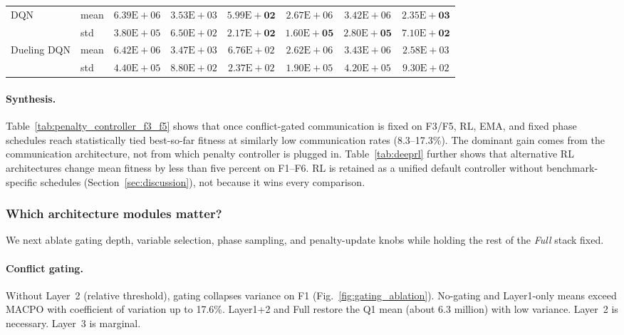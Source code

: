 \documentclass[conference]{IEEEtran}
\begin{document}
\begin{table}[!t]
\begin{tabular}{llcccccc}
DQN & mean & $6.39\mathrm{E}\!+\!06$ & $3.53\mathrm{E}\!+\!03$ & $\mathbf{5.99\mathrm{E}\!+\!02}$ & $2.67\mathrm{E}\!+\!06$ & $3.42\mathrm{E}\!+\!06$ & $\mathbf{2.35\mathrm{E}\!+\!03}$ \\
 & std & $3.80\mathrm{E}\!+\!05$ & $6.50\mathrm{E}\!+\!02$ & $\mathbf{2.17\mathrm{E}\!+\!02}$ & $\mathbf{1.60\mathrm{E}\!+\!05}$ & $\mathbf{2.80\mathrm{E}\!+\!05}$ & $\mathbf{7.10\mathrm{E}\!+\!02}$ \\
Dueling DQN & mean & $6.42\mathrm{E}\!+\!06$ & $3.47\mathrm{E}\!+\!03$ & $6.76\mathrm{E}\!+\!02$ & $2.62\mathrm{E}\!+\!06$ & $3.43\mathrm{E}\!+\!06$ & $2.58\mathrm{E}\!+\!03$ \\
 & std & $4.40\mathrm{E}\!+\!05$ & $8.80\mathrm{E}\!+\!02$ & $2.37\mathrm{E}\!+\!02$ & $1.90\mathrm{E}\!+\!05$ & $4.20\mathrm{E}\!+\!05$ & $9.30\mathrm{E}\!+\!02$ \\
\bottomrule
\end{tabular}
\end{table}

\paragraph{Synthesis.} Table~\ref{tab:penalty_controller_f3_f5} shows that once conflict-gated communication is fixed on F3/F5, RL, EMA, and fixed phase schedules reach statistically tied best-so-far fitness at similarly low communication rates (8.3--17.3\%). The dominant gain comes from the communication architecture, not from which penalty controller is plugged in. Table~\ref{tab:deeprl} further shows that alternative RL architectures change mean fitness by less than five percent on F1--F6. RL is retained as a unified default controller without benchmark-specific schedules (Section~\ref{sec:discussion}), not because it wins every comparison.

\subsubsection{Which architecture modules matter?}\label{sec:q3_modules}
We next ablate gating depth, variable selection, phase sampling, and penalty-update knobs while holding the rest of the \emph{Full} stack fixed.

\paragraph{Conflict gating.} Without Layer~2 (relative threshold), gating collapses variance on F1 (Fig.~\ref{fig:gating_ablation}). No-gating and Layer1-only means exceed MACPO with coefficient of variation up to 17.6\%. Layer1+2 and Full restore the Q1 mean (about 6.3 million) with low variance. Layer~2 is necessary. Layer~3 is marginal.
\end{document}
